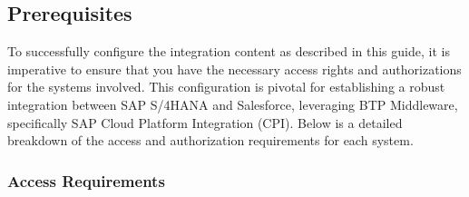 \subsection{Prerequisites}

To successfully configure the integration content as described in this guide, it is imperative to ensure that you have the necessary access rights and authorizations for the systems involved. This configuration is pivotal for establishing a robust integration between SAP S/4HANA and Salesforce, leveraging BTP Middleware, specifically SAP Cloud Platform Integration (CPI). Below is a detailed breakdown of the access and authorization requirements for each system.

\subsubsection{Access Requirements}
